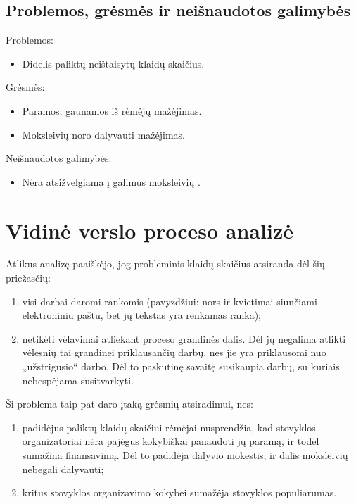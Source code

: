 \subsection{Problemos, grėsmės ir neišnaudotos galimybės}

Problemos:
\begin{itemize}
  \item Didelis paliktų neištaisytų klaidų skaičius.
\end{itemize}

Grėsmės:
\begin{itemize}
  \item Paramos, gaunamos iš rėmėjų mažėjimas. 
  \item Moksleivių noro dalyvauti mažėjimas.
\end{itemize}

Neišnaudotos galimybės:
\begin{itemize}
  \item Nėra atsižvelgiama į galimus moksleivių \glsspecporeikdgsg.
\end{itemize}

\section{Vidinė verslo proceso analizė}

Atlikus analizę paaiškėjo, jog probleminis klaidų skaičius atsiranda dėl
šių priežasčių:
\begin{enumerate}
  \item visi darbai daromi rankomis (pavyzdžiui: nors ir kvietimai
    siunčiami elektroniniu paštu, bet jų tekstas yra renkamas ranka);
  \item netikėti vėlavimai atliekant proceso grandinės dalis. Dėl jų 
    negalima atlikti vėlesnių tai grandinei priklausančių darbų, nes
    jie yra priklausomi nuo „užstrigusio“ darbo. Dėl to paskutinę 
    savaitę susikaupia darbų, su kuriais nebespėjama susitvarkyti.
\end{enumerate}

Ši problema taip pat daro įtaką grėsmių atsiradimui, nes:
\begin{enumerate}
  \item padidėjus paliktų klaidų skaičiui rėmėjai nusprendžia, kad 
    stovyklos organizatoriai nėra pajėgūs kokybiškai panaudoti jų paramą,
    ir todėl sumažina finansavimą. Dėl to padidėja dalyvio mokestis, ir
    dalis moksleivių nebegali dalyvauti;
  \item kritus stovyklos organizavimo kokybei sumažėja stovyklos
    populiarumas.
\end{enumerate}

